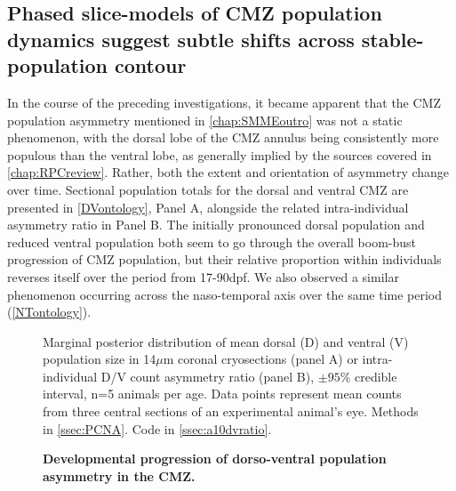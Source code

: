 \documentclass{ut-thesis}
\begin{document}
\begin{NoHyper}
\FloatBarrier

\section{Phased slice-models of CMZ population dynamics suggest subtle shifts across stable-population contour}
\label{sec:sliceGMC}

In the course of the preceding investigations, it became apparent that the CMZ population asymmetry mentioned in \autoref{chap:SMMEoutro} was not a static phenomenon, with the dorsal lobe of the CMZ annulus being consistently more populous than the ventral lobe, as generally implied by the sources covered in \autoref{chap:RPCreview}. Rather, both the extent and orientation of asymmetry change over time. Sectional population totals for the dorsal and ventral CMZ are presented in \autoref{DVontology}, Panel A, alongside the related intra-individual asymmetry ratio in Panel B. The initially pronounced dorsal population and reduced ventral population both seem to go through the overall boom-bust progression of CMZ population, but their relative proportion within individuals reverses itself over the period from 17-90dpf. We also observed a similar phenomenon occurring across the naso-temporal axis over the same time period (\autoref{NTontology}).

\begin{figure}[!h]
    \caption{{\bf Developmental progression of dorso-ventral population asymmetry in the CMZ.}}
    Marginal posterior distribution of mean dorsal (D) and ventral (V) population size in 14$\mu$m coronal cryosections (panel A) or intra-individual D/V count asymmetry ratio (panel B), $\pm 95\%$ credible interval, n=5 animals per age. Data points represent mean counts from three central sections of an experimental animal's eye. 
    \label{DVontology}
    Methods in \autoref{ssec:PCNA}.
    Code in \autoref{ssec:a10dvratio}. 
\end{figure}


\end{NoHyper}
\end{document}
